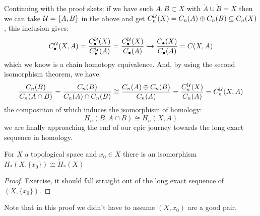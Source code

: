 \documentclass[a4paper]{article}
\begin{document}
Continuing with the proof skets: if we have such $A,B\subset X$ with $\mathring{A}\cup\mathring{B}=X$ then we can take $\mathcal{U}=\{A,B\}$ in the above and get $C_n^{\mathcal{U}}(X)=C_n(A)\oplus C_n(B) \subseteq C_n(X)$, this inclusion gives:\[
    C_\bullet^{\mathcal{U}}(X,A)=\frac{C_\bullet^{\mathcal{U}}(X)}{C_\bullet^{\mathcal{U}}(A)} = \frac{C_\bullet^{\mathcal{U}}(X)}{C_\bullet(A)} \hookrightarrow \frac{C_\bullet(X)}{C_\bullet(A)} = C(X,A)
\]
which we know is a chain homotopy equivalence. And, by using the second isomorphism theorem, we have: \[
    \frac{C_n(B)}{C_n(A\cap B)} = \frac{C_n(B)}{C_n(A)\cap C_n(B)} \cong \frac{C_n(A)\oplus C_n(B)}{C_n(A)} = \frac{C_n^{\mathcal{U}}(X)}{C_n(A)} = C_n^{\mathcal{U}}(X,A)
\]
the composition of which induces the isomorphism of homology:\[
    H_n(B,A\cap B) \cong H_n(X,A)
\]
we are finally approaching the end of our epic journey towards the long exact sequence in homology.
\begin{lemma}
    For $X$ a topological space and $x_0\in X$ there is an isomorphism $H_*(X,\{x_0\})\cong\tilde{H}_*(X)$
    \begin{proof}
        Exercise, it should fall straight out of the long exact sequence of $(X,\{x_0\})$.
    \end{proof}
\end{lemma}
Note that in this proof we didn't have to assume $(X,x_0)$ are a good pair.
\end{document}
